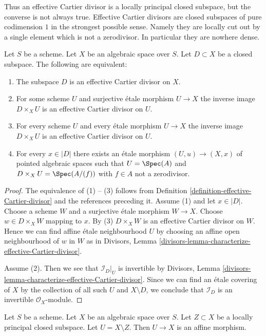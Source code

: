 \noindent
Thus an effective Cartier divisor is a locally principal closed subspace,
but the converse is not always true. Effective Cartier divisors are closed
subspaces of pure codimension $1$ in the strongest possible sense. Namely
they are locally cut out by a single element which is not a zerodivisor.
In particular they are nowhere dense.

\begin{lemma}
\label{lemma-characterize-effective-Cartier-divisor}
Let $S$ be a scheme. Let $X$ be an algebraic space over $S$.
Let $D \subset X$ be a closed subspace.
The following are equivalent:
\begin{enumerate}
\item The subspace $D$ is an effective Cartier divisor on $X$.
\item For some scheme $U$ and surjective \'etale morphism $U \to X$
the inverse image $D \times_X U$ is an effective Cartier divisor on $U$.
\item For every scheme $U$ and every \'etale morphism $U \to X$
the inverse image $D \times_X U$ is an effective Cartier divisor on $U$.
\item For every $x \in |D|$ there exists an \'etale morphism
$(U, u) \to (X, x)$ of pointed algebraic spaces such that $U = \Spec(A)$
and $D \times_X U = \Spec(A/(f))$ with $f \in A$ not a zerodivisor.
\end{enumerate}
\end{lemma}

\begin{proof}
The equivalence of (1) -- (3) follows from
Definition \ref{definition-effective-Cartier-divisor}
and the references preceding it.
Assume (1) and let $x \in |D|$. Choose a scheme $W$ and a
surjective \'etale morphism
$W \to X$. Choose $w \in D \times_X W$ mapping to $x$.
By (3) $D \times_X W$ is an effective Cartier
divisor on $W$. Hence we can find affine \'etale neighbourhood $U$
by choosing an affine open neighbourhood of $w$ in $W$ as in
Divisors, Lemma \ref{divisors-lemma-characterize-effective-Cartier-divisor}.

\medskip\noindent
Assume (2). Then we see that $\mathcal{I}_D|_U$ is invertible by
Divisors, Lemma \ref{divisors-lemma-characterize-effective-Cartier-divisor}.
Since we can find an \'etale covering of $X$ by the collection of
all such $U$ and $X \setminus D$, we conclude that
$\mathcal{I}_D$ is an invertible $\mathcal{O}_X$-module.
\end{proof}

\begin{lemma}
\label{lemma-complement-locally-principal-closed-subscheme}
Let $S$ be a scheme. Let $X$ be an algebraic space over $S$.
Let $Z \subset X$ be a locally principal closed
subspace. Let $U = X \setminus Z$. Then $U \to X$ is an affine morphism.
\end{lemma}

